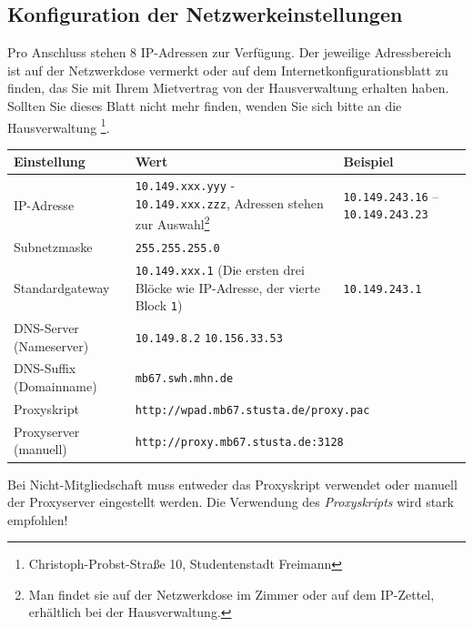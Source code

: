 \documentclass[a4paper,12pt]{scrartcl}
\begin{document}
\subsection*{Konfiguration der Netzwerkeinstellungen}

Pro Anschluss stehen 8 IP-Adressen zur Verfügung. Der jeweilige Adressbereich ist auf der Netzwerkdose vermerkt oder auf dem Internetkonfigurationsblatt zu finden, das Sie mit Ihrem Mietvertrag von der Hausverwaltung erhalten haben. Sollten Sie dieses Blatt nicht mehr finden, wenden Sie sich bitte an die Hausverwaltung \footnote{Christoph-Probst-Straße 10, Studentenstadt Freimann}.




\begin{center}
	\begin{tabularx}{\linewidth}{|lXp{.2\linewidth}|}
		\hline
		Einstellung & Wert & Beispiel \\
		\hline \hline
		IP-Adresse & \nolinkurl{10.149.xxx.yyy} - \nolinkurl{10.149.xxx.zzz}, \newline 8 Adressen stehen zur Auswahl\footnote{Man findet sie auf der Netzwerkdose im Zimmer oder auf dem IP-Zettel, erhältlich bei der Hausverwaltung.} & \nolinkurl{10.149.243.16} – \nolinkurl{10.149.243.23} \\
		\hline
		Subnetzmaske & \nolinkurl{255.255.255.0} & \\
		\hline
		Standardgateway & \nolinkurl{10.149.xxx.1} \newline (Die ersten drei Blöcke wie IP-Adresse, der vierte Block \nolinkurl{1}) & \nolinkurl{10.149.243.1} \\
		\hline
		DNS-Server (Nameserver) & \nolinkurl{10.149.8.2} \newline \nolinkurl{10.156.33.53}& \\
		\hline
		DNS-Suffix (Domainname) & \nolinkurl{mb67.swh.mhn.de} & \\
		\hline
		Proxyskript & \multicolumn{2}{l|}{\nolinkurl{http://wpad.mb67.stusta.de/proxy.pac}} \\
		\hline
		Proxyserver (manuell) & \multicolumn{2}{l|}{\nolinkurl{http://proxy.mb67.stusta.de:3128}} \\
		\hline
	\end{tabularx}
\end{center}
Bei Nicht-Mitgliedschaft muss entweder das Proxyskript verwendet oder manuell der Proxyserver eingestellt werden. Die Verwendung des \emph{Proxyskripts} wird stark empfohlen!

\newpage
\enlargethispage{20pt}
\end{document}

